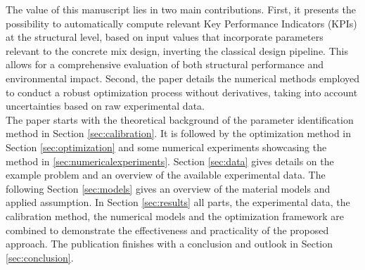 %
The value of this manuscript lies in two main contributions. 
First, it presents the possibility to automatically compute relevant Key Performance Indicators (KPIs) at the structural level, based on input values that incorporate parameters relevant to the concrete mix design, inverting the classical design pipeline.
This allows for a comprehensive evaluation of both structural performance and environmental impact. 
Second, the paper details the numerical methods employed to conduct a robust optimization process without derivatives, taking into account uncertainties based on raw experimental data.
\\
The paper starts  with the theoretical background of the parameter identification method in Section \ref{sec:calibration}.
It is followed by the optimization method in Section \ref{sec:optimization} and some numerical experiments showcasing the method in \ref{sec:numericalexperiments}.
Section \ref{sec:data} gives details on the example problem and an overview of the available experimental data.
The following Section \ref{sec:models} gives an overview of the material models and applied assumption. 
In Section \ref{sec:results} all parts, the experimental data, the calibration method, the numerical models and the optimization framework are combined to demonstrate the effectiveness and practicality of the proposed approach.
The publication finishes with a conclusion and outlook in Section \ref{sec:conclusion}.